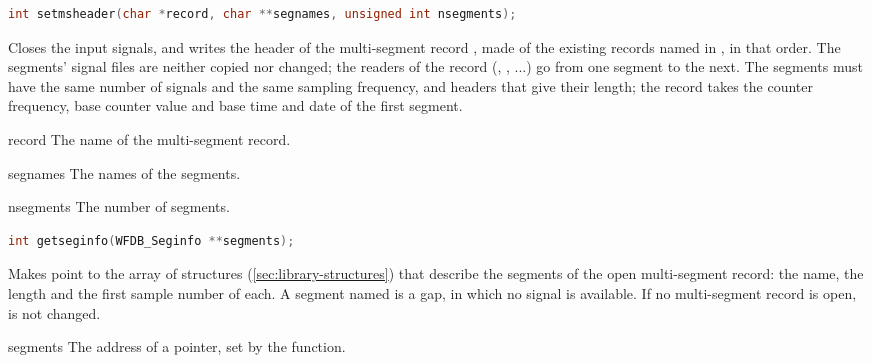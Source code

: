 \begin{lstlisting}[language=C,style=signature]
int setmsheader(char *record, char **segnames, unsigned int nsegments);
\end{lstlisting}
Closes the input signals, and writes the header of the multi-segment record
, made of the  existing records named in
, in that order. The segments' signal files are neither
copied nor changed; the readers of the record (,
, ...) go from one segment to the next. The segments must
have the same number of signals and the same sampling frequency, and headers
that give their length; the record takes the counter frequency, base counter
value and base time and date of the first segment.
\begin{params}
\item[record] The name of the multi-segment record.
\item[segnames] The names of the segments.
\item[nsegments] The number of segments.
\end{params}

\begin{lstlisting}[language=C,style=signature]
int getseginfo(WFDB_Seginfo **segments);
\end{lstlisting}
Makes  point to the array of  structures
(\cref{sec:library-structures}) that describe the segments of the open
multi-segment record: the name, the length and the first sample number of
each. A segment named \code{\textasciitilde} is a gap, in which no signal is
available. If no multi-segment record is open,  is not
changed.
\begin{params}
\item[segments] The address of a pointer, set by the function.
\end{params}

